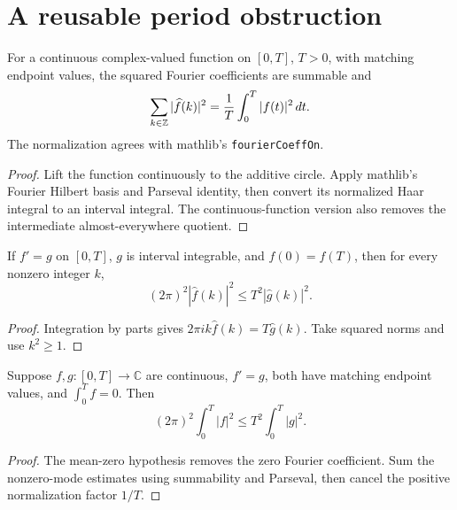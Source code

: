 \section{A reusable period obstruction}

\begin{lemma}
\label{lem:fourier-energy}
\leanok
For a continuous complex-valued function on $[0,T]$, $T>0$, with
matching endpoint values, the squared Fourier coefficients are summable and
\[
 \sum_{k\in\mathbb{Z}}|\widehat f(k)|^2=\frac1T\int_0^T|f(t)|^2\,dt.
\]
The normalization agrees with mathlib's \texttt{fourierCoeffOn}.
\end{lemma}
\begin{proof}
\leanok
Lift the function continuously to the additive circle. Apply mathlib's
Fourier Hilbert basis and Parseval identity, then convert its normalized
Haar integral to an interval integral. The continuous-function version
also removes the intermediate almost-everywhere quotient.
\end{proof}

\begin{lemma}
\label{lem:fourier-mode}
\leanok
If $f'=g$ on $[0,T]$, $g$ is interval integrable, and $f(0)=f(T)$,
then for every nonzero integer $k$,
\[
 (2\pi)^2|\widehat f(k)|^2\leq T^2|\widehat g(k)|^2.
\]
\end{lemma}
\begin{proof}
\leanok
Integration by parts gives $2\pi i k\widehat f(k)=T\widehat g(k)$.
Take squared norms and use $k^2\geq1$.
\end{proof}

\begin{proposition}
\label{prop:wirtinger-complex}
\leanok
{}
Suppose $f,g:[0,T]\to\mathbb C$ are continuous, $f'=g$, both have
matching endpoint values, and $\int_0^T f=0$. Then
\[
 (2\pi)^2\int_0^T|f|^2\leq T^2\int_0^T|g|^2.
\]
\end{proposition}
\begin{proof}
\leanok
The mean-zero hypothesis removes the zero Fourier coefficient. Sum the
nonzero-mode estimates using summability and Parseval, then cancel the
positive normalization factor $1/T$.
\end{proof}

